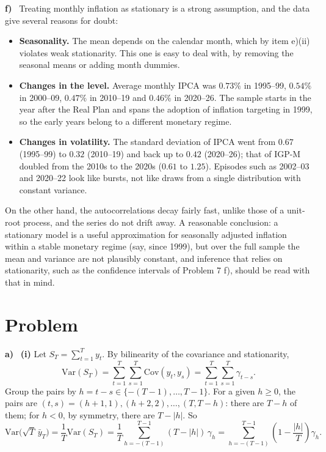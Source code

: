 \documentclass[11pt]{article}
\newcommand{\Var}{\mathrm{Var}}
\newcommand{\Cov}{\mathrm{Cov}}
\newcounter{problem}
\renewcommand{\theproblem}{\arabic{problem}}
\newcommand{\problem}{
	\stepcounter{problem}
	\section*{Problem \theproblem}
}
\newcommand{\itm}[1]{\par\textbf{#1)}\ }
\begin{document}
\itm{f}
Treating monthly inflation as stationary is a strong assumption, and the data give several reasons for doubt:
\begin{itemize}
	\item \textbf{Seasonality.} The mean depends on the calendar month, which by item e)(ii) violates weak stationarity. This one is easy to deal with, by removing the seasonal means or adding month dummies.
	\item \textbf{Changes in the level.} Average monthly IPCA was $0.73\%$ in 1995--99, $0.54\%$ in 2000--09, $0.47\%$ in 2010--19 and $0.46\%$ in 2020--26. The sample starts in the year after the Real Plan and spans the adoption of inflation targeting in 1999, so the early years belong to a different monetary regime.
	\item \textbf{Changes in volatility.} The standard deviation of IPCA went from $0.67$ (1995--99) to $0.32$ (2010--19) and back up to $0.42$ (2020--26); that of IGP-M doubled from the 2010s to the 2020s ($0.61$ to $1.25$). Episodes such as 2002--03 and 2020--22 look like bursts, not like draws from a single distribution with constant variance.
\end{itemize}
On the other hand, the autocorrelations decay fairly fast, unlike those of a unit-root process, and the series do not drift away. A reasonable conclusion: a stationary model is a useful approximation for seasonally adjusted inflation within a stable monetary regime (say, since 1999), but over the full sample the mean and variance are not plausibly constant, and inference that relies on stationarity, such as the confidence intervals of Problem 7 f), should be read with that in mind.



\problem

\itm{a}
\textbf{(i)} Let $S_T=\sum_{t=1}^Ty_t$. By bilinearity of the covariance and stationarity,
\[
\Var(S_T) = \sum_{t=1}^T\sum_{s=1}^T\Cov(y_t,y_s) = \sum_{t=1}^T\sum_{s=1}^T\gamma_{t-s}.
\]
Group the pairs by $h=t-s\in\{-(T-1),\dots,T-1\}$. For a given $h\ge0$, the pairs are $(t,s)=(h+1,1),(h+2,2),\dots,(T,T-h)$: there are $T-h$ of them; for $h<0$, by symmetry, there are $T-|h|$. So
\[
\Var\big(\sqrt T\,\bar y_T\big) = \frac1T\Var(S_T) = \frac1T\sum_{h=-(T-1)}^{T-1}(T-|h|)\,\gamma_h = \sum_{h=-(T-1)}^{T-1}\left(1-\frac{|h|}T\right)\gamma_h .
\]
\end{document}
